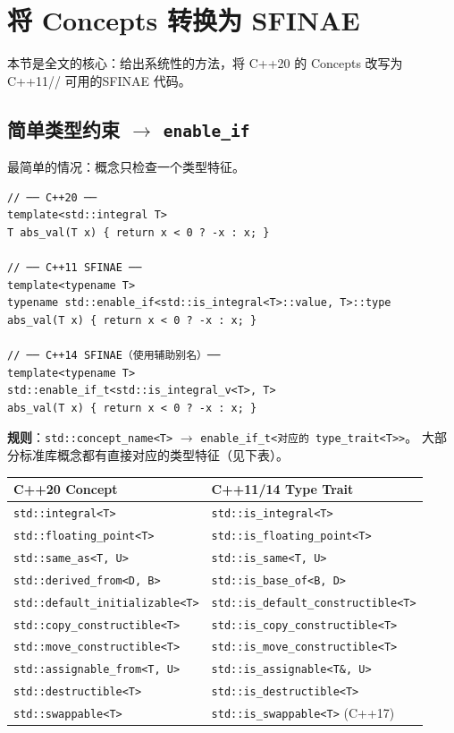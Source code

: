 \documentclass[12pt,a4paper,fontset=fandol]{ctexbook}
\begin{document}
\section{将 Concepts 转换为 SFINAE}

本节是全文的核心：给出系统性的方法，将 C++20 的 Concepts 改写为 C++11/\allowbreak{}/\allowbreak{} 可用的\allowbreak SFINAE 代码。

\subsection{简单类型约束 $\to$ \texttt{enable\_if}}

最简单的情况：概念只检查一个类型特征。

\begin{lstlisting}
// ── C++20 ──
template<std::integral T>
T abs_val(T x) { return x < 0 ? -x : x; }

// ── C++11 SFINAE ──
template<typename T>
typename std::enable_if<std::is_integral<T>::value, T>::type
abs_val(T x) { return x < 0 ? -x : x; }

// ── C++14 SFINAE（使用辅助别名）──
template<typename T>
std::enable_if_t<std::is_integral_v<T>, T>
abs_val(T x) { return x < 0 ? -x : x; }
\end{lstlisting}

\textbf{规则}：\texttt{std::concept\_name<T>} $\to$ \texttt{enable\_if\_t<对应的 type\_trait<T>>}。
大部分标准库概念都有直接对应的类型特征（见下表）。

\begin{center}
\small
\begin{tabular}{ll}
\toprule
\textbf{C++20 Concept} & \textbf{C++11/14 Type Trait} \\
\midrule
\texttt{std::integral<T>} & \texttt{std::is\_integral<T>} \\
\texttt{std::floating\_point<T>} & \texttt{std::is\_floating\_point<T>} \\
\texttt{std::same\_as<T, U>} & \texttt{std::is\_same<T, U>} \\
\texttt{std::derived\_from<D, B>} & \texttt{std::is\_base\_of<B, D>} \\
\texttt{std::default\_initializable<T>} & \texttt{std::is\_default\_constructible<T>} \\
\texttt{std::copy\_constructible<T>} & \texttt{std::is\_copy\_constructible<T>} \\
\texttt{std::move\_constructible<T>} & \texttt{std::is\_move\_constructible<T>} \\
\texttt{std::assignable\_from<T, U>} & \texttt{std::is\_assignable<T\&, U>} \\
\texttt{std::destructible<T>} & \texttt{std::is\_destructible<T>} \\
\texttt{std::swappable<T>} & \texttt{std::is\_swappable<T>} (C++17) \\
\bottomrule
\end{tabular}
\end{center}
\end{document}
